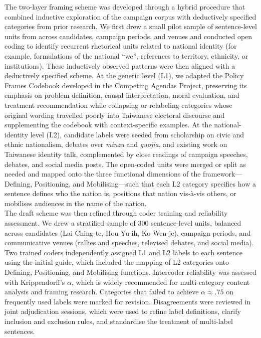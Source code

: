 \documentclass[man,12pt]{apa7}
\begin{document}
The two-layer framing scheme was developed through a hybrid procedure that combined inductive exploration of the campaign corpus with deductively specified categories from prior research. 
We first drew a small pilot sample of sentence-level units from across candidates, campaign periods, and venues and conducted open coding to identify recurrent rhetorical units related to national identity (for example, formulations of the national ``we'', references to territory, ethnicity, or institutions). 
These inductively observed patterns were then aligned with a deductively specified scheme. 
At the generic level (L1), we adapted the Policy Frames Codebook developed in the Competing Agendas Project, preserving its emphasis on problem definition, causal interpretation, moral evaluation, and treatment recommendation 
while collapsing or relabeling categories whose original wording travelled poorly into Taiwanese electoral discourse and supplementing the codebook with context-specific examples. 
At the national-identity level (L2), candidate labels were seeded from scholarship on civic and ethnic nationalism, debates over \emph{minzu} and \emph{guojia}, and existing work on Taiwanese identity talk, 
complemented by close readings of campaign speeches, debates, and social media posts. 
The open-coded units were merged or split as needed and mapped onto the three functional dimensions of the framework—Defining, Positioning, and Mobilising—such that each L2 category specifies how a sentence defines who the nation is, positions that nation vis-à-vis others, or mobilises audiences in the name of the nation.\\%
The draft scheme was then refined through coder training and reliability assessment. 
We drew a stratified sample of 300 sentence-level units, balanced across candidates (Lai Ching-te, Hou Yu-ih, Ko Wen-je), campaign periods, and communicative venues (rallies and speeches, televised debates, and social media). 
Two trained coders independently assigned L1 and L2 labels to each sentence using the initial guide, which included the mapping of L2 categories onto Defining, Positioning, and Mobilising functions. 
Intercoder reliability was assessed with Krippendorff's $\alpha$, which is widely recommended for multi-category content analysis and framing research. 
Categories that failed to achieve $\alpha \approx .75$ on frequently used labels were marked for revision. 
Disagreements were reviewed in joint adjudication sessions, which were used to refine label definitions, clarify inclusion and exclusion rules, and standardise the treatment of multi-label sentences. 
\end{document}
